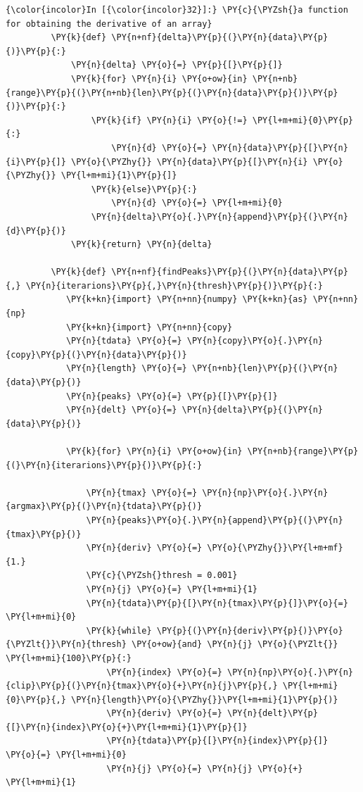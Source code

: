     \begin{Verbatim}[commandchars=\\\{\}]
{\color{incolor}In [{\color{incolor}32}]:} \PY{c}{\PYZsh{}a function for obtaining the derivative of an array}
         \PY{k}{def} \PY{n+nf}{delta}\PY{p}{(}\PY{n}{data}\PY{p}{)}\PY{p}{:}
             \PY{n}{delta} \PY{o}{=} \PY{p}{[}\PY{p}{]}
             \PY{k}{for} \PY{n}{i} \PY{o+ow}{in} \PY{n+nb}{range}\PY{p}{(}\PY{n+nb}{len}\PY{p}{(}\PY{n}{data}\PY{p}{)}\PY{p}{)}\PY{p}{:}
                 \PY{k}{if} \PY{n}{i} \PY{o}{!=} \PY{l+m+mi}{0}\PY{p}{:}
                     \PY{n}{d} \PY{o}{=} \PY{n}{data}\PY{p}{[}\PY{n}{i}\PY{p}{]} \PY{o}{\PYZhy{}} \PY{n}{data}\PY{p}{[}\PY{n}{i} \PY{o}{\PYZhy{}} \PY{l+m+mi}{1}\PY{p}{]} 
                 \PY{k}{else}\PY{p}{:} 
                     \PY{n}{d} \PY{o}{=} \PY{l+m+mi}{0}
                 \PY{n}{delta}\PY{o}{.}\PY{n}{append}\PY{p}{(}\PY{n}{d}\PY{p}{)}
             \PY{k}{return} \PY{n}{delta}
         
         \PY{k}{def} \PY{n+nf}{findPeaks}\PY{p}{(}\PY{n}{data}\PY{p}{,} \PY{n}{iterarions}\PY{p}{,}\PY{n}{thresh}\PY{p}{)}\PY{p}{:}
         	\PY{k+kn}{import} \PY{n+nn}{numpy} \PY{k+kn}{as} \PY{n+nn}{np}
         	\PY{k+kn}{import} \PY{n+nn}{copy}
         	\PY{n}{tdata} \PY{o}{=} \PY{n}{copy}\PY{o}{.}\PY{n}{copy}\PY{p}{(}\PY{n}{data}\PY{p}{)}
         	\PY{n}{length} \PY{o}{=} \PY{n+nb}{len}\PY{p}{(}\PY{n}{data}\PY{p}{)}
         	\PY{n}{peaks} \PY{o}{=} \PY{p}{[}\PY{p}{]}
         	\PY{n}{delt} \PY{o}{=} \PY{n}{delta}\PY{p}{(}\PY{n}{data}\PY{p}{)}
         
         	\PY{k}{for} \PY{n}{i} \PY{o+ow}{in} \PY{n+nb}{range}\PY{p}{(}\PY{n}{iterarions}\PY{p}{)}\PY{p}{:}
         		
         		\PY{n}{tmax} \PY{o}{=} \PY{n}{np}\PY{o}{.}\PY{n}{argmax}\PY{p}{(}\PY{n}{tdata}\PY{p}{)}
         		\PY{n}{peaks}\PY{o}{.}\PY{n}{append}\PY{p}{(}\PY{n}{tmax}\PY{p}{)}
         		\PY{n}{deriv} \PY{o}{=} \PY{o}{\PYZhy{}}\PY{l+m+mf}{1.}
         		\PY{c}{\PYZsh{}thresh = 0.001}
         		\PY{n}{j} \PY{o}{=} \PY{l+m+mi}{1}
         		\PY{n}{tdata}\PY{p}{[}\PY{n}{tmax}\PY{p}{]}\PY{o}{=} \PY{l+m+mi}{0}
         		\PY{k}{while} \PY{p}{(}\PY{n}{deriv}\PY{p}{)}\PY{o}{\PYZlt{}}\PY{n}{thresh} \PY{o+ow}{and} \PY{n}{j} \PY{o}{\PYZlt{}} \PY{l+m+mi}{100}\PY{p}{:}
         			\PY{n}{index} \PY{o}{=} \PY{n}{np}\PY{o}{.}\PY{n}{clip}\PY{p}{(}\PY{n}{tmax}\PY{o}{+}\PY{n}{j}\PY{p}{,} \PY{l+m+mi}{0}\PY{p}{,} \PY{n}{length}\PY{o}{\PYZhy{}}\PY{l+m+mi}{1}\PY{p}{)}
         			\PY{n}{deriv} \PY{o}{=} \PY{n}{delt}\PY{p}{[}\PY{n}{index}\PY{o}{+}\PY{l+m+mi}{1}\PY{p}{]}
         			\PY{n}{tdata}\PY{p}{[}\PY{n}{index}\PY{p}{]} \PY{o}{=} \PY{l+m+mi}{0}
         			\PY{n}{j} \PY{o}{=} \PY{n}{j} \PY{o}{+} \PY{l+m+mi}{1} 
         		

\end{Verbatim}
